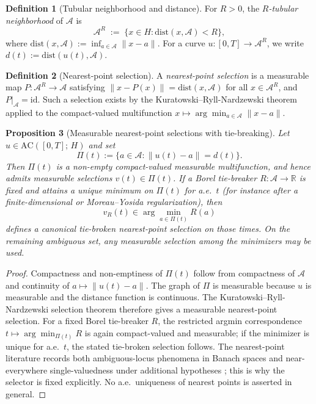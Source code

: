 \documentclass[12pt,a4paper]{article}
\theoremstyle{definition}
\newtheorem{definition}{Definition}[section]
\theoremstyle{plain}
\newtheorem{proposition}[definition]{Proposition}
\theoremstyle{remark}
\newcommand{\dist}{\mathrm{dist}}
\newcommand{\AC}{\mathrm{AC}}
\newcommand{\id}{\mathrm{id}}
\begin{document}
\begin{definition}[Tubular neighborhood and distance]
\label{def:tube}
For $R > 0$, the \emph{$R$-tubular neighborhood} of $\mathcal{A}$ is
\[
  \mathcal{A}^R
  \;:=\;
  \{x \in H : \dist(x, \mathcal{A}) < R\},
\]
where $\dist(x, \mathcal{A}) := \inf_{a \in \mathcal{A}} \|x - a\|$.
For a curve $u: [0,T] \to \mathcal{A}^R$, we write
$d(t) := \dist(u(t), \mathcal{A})$.
\end{definition}

\begin{definition}[Nearest-point selection]
\label{def:selection}
A \emph{nearest-point selection} is a measurable map
$P: \mathcal{A}^R \to \mathcal{A}$ satisfying
$\|x - P(x)\| = \dist(x, \mathcal{A})$ for all
$x \in \mathcal{A}^R$, and $P|_{\mathcal{A}} = \id$.
Such a selection exists by the Kuratowski--Ryll-Nardzewski theorem
applied to the compact-valued multifunction
$x \mapsto \arg\min_{a \in \mathcal{A}} \|x-a\|$.
\end{definition}

\begin{proposition}[Measurable nearest-point selections with tie-breaking]
\label{prop:minimal-selection}
Let $u \in \AC([0,T];\,H)$ and set
\[
  \Pi(t) := \{a \in \mathcal{A} : \|u(t)-a\| = d(t)\}.
\]
Then $\Pi(t)$ is a non-empty compact-valued measurable
multifunction, and hence admits measurable selections
$v(t) \in \Pi(t)$.  If a Borel tie-breaker
$R:\mathcal{A}\to\mathbb{R}$ is fixed and attains a unique
minimum on $\Pi(t)$ for a.e.\ $t$ (for instance after a
finite-dimensional or Moreau--Yosida regularization), then
\[
  v_R(t) \in \arg\min_{a\in\Pi(t)} R(a)
\]
defines a canonical tie-broken nearest-point selection on those
times.  On the remaining ambiguous set, any measurable selection
among the minimizers may be used.
\end{proposition}

\begin{proof}
Compactness and non-emptiness of $\Pi(t)$ follow from compactness of
$\mathcal{A}$ and continuity of $a\mapsto \|u(t)-a\|$.  The graph of
$\Pi$ is measurable because $u$ is measurable and the distance
function is continuous.  The Kuratowski--Ryll-Nardzewski selection
theorem therefore gives a measurable nearest-point selection.
For a fixed Borel tie-breaker $R$, the restricted argmin
correspondence $t\mapsto\arg\min_{\Pi(t)}R$ is again compact-valued
and measurable; if the minimizer is unique for a.e.\ $t$, the stated
tie-broken selection follows.  The nearest-point literature records
both ambiguous-locus phenomena in Banach spaces
\cite{DeBlasiMyjak1993} and near-everywhere single-valuedness under
additional hypotheses \cite{Zamfirescu1990}; this is why the selector
is fixed explicitly.  No a.e.\ uniqueness of nearest points is asserted
in general.
\end{proof}
\end{document}
